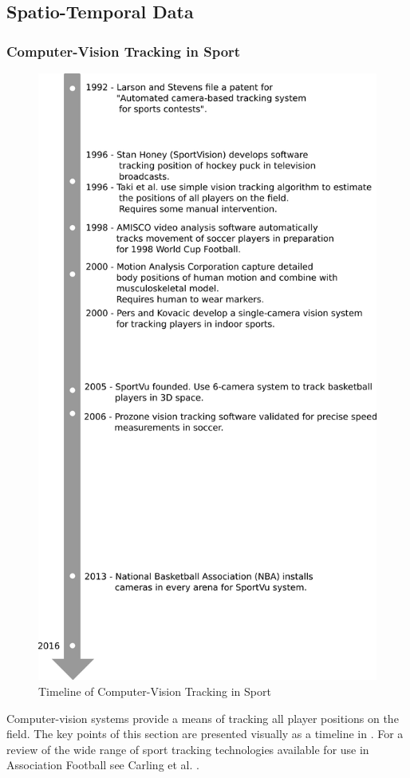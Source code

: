 \subsection{Spatio-Temporal Data}\label{spatio-temporal-data}

\subsubsection{Computer-Vision Tracking in
Sport}\label{computer-vision-tracking-in-sport}

\begin{figure}[htbp]
\centering
\includegraphics[width=0.8\linewidth]{figs/model/vision.png}
\caption{Timeline of Computer-Vision Tracking in Sport
\label{fig:vision}}
\end{figure}

Computer-vision systems provide a means of tracking all player positions
on the field. The key points of this section are presented visually as a
timeline in . For a review of the wide range of
sport tracking technologies available for use in Association
Football see Carling et al. \cite{carling_role_2008}.


